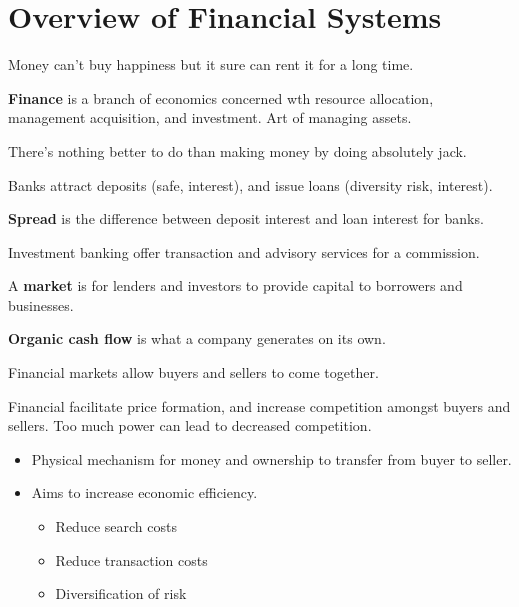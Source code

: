 \documentclass[english, 12pt]{article}
\begin{document}
\notesheader
\section{Overview of Financial Systems}
Money can't buy happiness but it sure can rent it for a long time.
\begin{defn}
\textbf{Finance} is a branch of economics concerned wth resource allocation, management acquisition, and investment. Art of managing assets.
\end{defn}
\begin{qte}
There's nothing better to do than making money by doing absolutely jack.
\end{qte}
Banks attract deposits (safe, interest), and issue loans (diversity risk, interest).
\begin{defn}
\textbf{Spread} is the difference between deposit interest and loan interest for banks.
\end{defn}

\begin{note}
Investment banking offer transaction and advisory services for a commission.
\end{note}


\begin{defn}
A \textbf{market} is for lenders and investors to provide capital to borrowers and businesses.
\end{defn}

\begin{defn}
\textbf{Organic cash flow} is what a company generates on its own.
\end{defn}

\begin{qte}
Financial markets allow buyers and sellers to come together.
\end{qte}
\begin{note}
Financial facilitate price formation, and increase competition amongst buyers and sellers. Too much power can lead to decreased competition.

\begin{itemize}
\item Physical mechanism for money and ownership to transfer from buyer to seller.
\item Aims to increase economic efficiency.
\begin{itemize}
\item Reduce search costs
\item Reduce transaction costs
\item Diversification of risk
\end{itemize}
\end{itemize}
\end{note}
\end{document}
